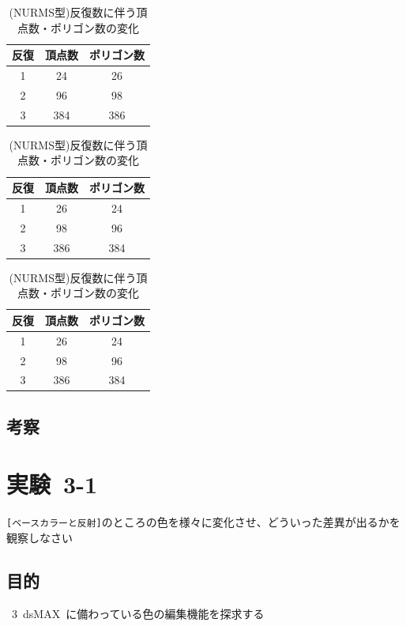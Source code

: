 \documentclass[a4j]{jarticle}
\begin{document}
\begin{table}
  \begin{minipage}{.30\textwidth}
  \caption{(従来型)反復数に伴う頂点数・ポリゴン数の変化}
  \label{table:juurai}
  \centering
  \begin{tabular}{|c|c|c|}
  \hline
  反復 & 頂点数 & ポリゴン数\\
  \hline
  1 & 24 & 26 \\
  2 & 96 & 98 \\
  3 & 384 & 386\\
  \hline
  \end{tabular}
  \end{minipage}
  \hfill
  \begin{minipage}{.30\textwidth}
  \caption{(四角形型)反復数に伴う頂点数・ポリゴン数の変化}
  \label{table:sikaku}
  \centering
  \begin{tabular}{|c|c|c|}
  \hline
  反復 & 頂点数 & ポリゴン数\\
  \hline
  1 & 26 & 24 \\
  2 & 98 & 96 \\
  3 & 386 & 384 \\
  \hline
  \end{tabular}
  \end{minipage}
  \hfill
  \begin{minipage}{.30\textwidth}
  \caption{(NURMS型)反復数に伴う頂点数・ポリゴン数の変化}
  \label{table:nurms}
  \centering
  \begin{tabular}{|c|c|c|}
  \hline
  反復 & 頂点数 & ポリゴン数\\
  \hline
  1 & 26 & 24 \\
  2 & 98 & 96 \\
  3 & 386 & 384 \\
  \hline
  \end{tabular}
  \end{minipage}
\end{table}
%
\subsection{考察}
%

%

\newpage
\section{実験\ 3-1}
\verb|[ベースカラーと反射]|のところの色を様々に変化させ、どういった差異が出るかを観察しなさい
\subsection{目的}
%
\ 3\ dsMAX\ に備わっている色の編集機能を探求する
%
\end{document}
